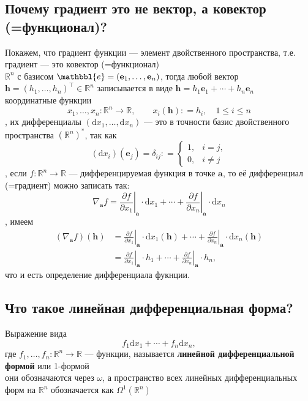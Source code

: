 \documentclass[a4paper]{article}
\newcommand{\e}{\mathbbl{e}}
\newcommand{\m}[1]{\mathbf{#1}}
\begin{document}
\subsection{Почему градиент это не вектор, а ковектор (=функционал)?}
Покажем, что градиент функции — элемент двойственного пространства, т.е. градиент — это ковектор (=функционал)\\[2mm]
 $\mathbb{R}^n$ с базисом $\e = (\m{e}_1,\ldots, \m{e}_n)$, тогда любой вектор $\m{h} = (h_1,\ldots, h_n)^\top  \in \mathbb{R}^n$ записывается в виде $\m{h} = h_1\m{e}_1 + \cdots + h_n \m{e}_n$\\[2mm]
 координатные функции 
$$
x_1,\ldots, x_n:\mathbb{R}^n \to \mathbb{R}, \qquad x_i(\m{h}): = h_i, \quad 1 \leqslant i \leqslant n
$$
, их дифференциалы $(\mathrm{d}x_1, \ldots, \mathrm{d}x_n)$ — это в точности базис двойственного пространства $(\mathbb{R}^n)^*$, так как
$$
(\mathrm{d}x_i)(\m{e}_j) = \delta_{ij}: = \begin{cases}
1, & i = j, \\
0, & i \ne j
\end{cases}
$$
, если $f:\mathbb{R}^n \to \mathbb{R}$ — дифференцируемая функция в точке $\m{a}$, то её дифференциал (=градиент) можно записать так:
$$
\boxed{
\nabla_\m{a} f = \left.\frac{\partial f}{\partial x_1}\right|_\m{a} \cdot \mathrm{d}x_1 + \cdots +  \left.\frac{\partial f}{\partial x_n}\right|_\m{a} \cdot \mathrm{d}x_n
}    
$$
, имеем\\
$$\begin{aligned}
(\nabla_\m{a} f) (\m{h}) &= \left.\frac{\partial f}{\partial x_1}\right|_\m{a} \cdot \mathrm{d}x_1(\m{h}) + \cdots +  \left.\frac{\partial f}{\partial x_n}\right|_\m{a} \cdot \mathrm{d}x_n (\m{h}) \\
&= \left.\frac{\partial f}{\partial x_1}\right|_\m{a} \cdot h_1 + \cdots +  \left.\frac{\partial f}{\partial x_n}\right|_\m{a} \cdot h_n ,
\end{aligned}$$
что и есть определение дифференциала фукнции.


\subsection{Что такое линейная дифференциальная форма?}
Выражение вида 
$$
f_1 \mathrm{d}x_1 + \cdots + f_n \mathrm{d}x_n,
$$
где $f_1,\ldots, f_n:\mathbb{R}^n \to \mathbb{R}$ — функции, называется \textbf{линейной дифференциальной формой} или 1-формой\\[2mm]
 они обозначаются через $\omega$, а пространство всех линейных дифференциальных форм на $\mathbb{R}^n$ обозначается как $\Omega^1(\mathbb{R}^n)$
\end{document}
